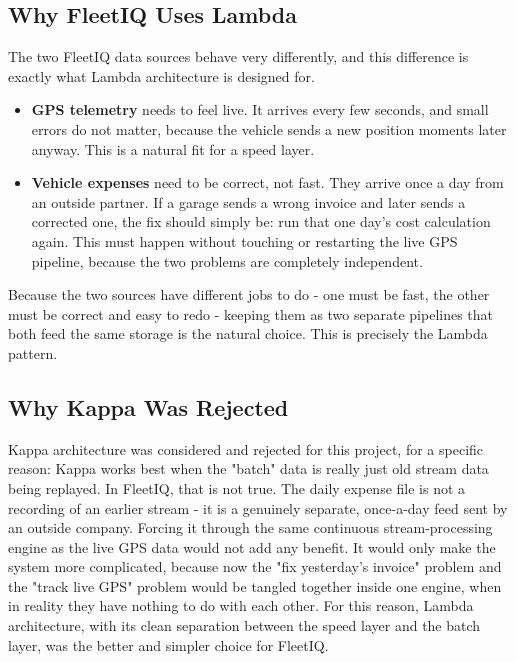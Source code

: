 \documentclass[12pt,a4paper]{article}
\begin{document}
\subsection{Why FleetIQ Uses Lambda}

The two FleetIQ data sources behave very differently, and this difference
is exactly what Lambda architecture is designed for.

\begin{itemize}
  \item \textbf{GPS telemetry} needs to feel live. It arrives every few
    seconds, and small errors do not matter, because the vehicle sends a new
    position moments later anyway. This is a natural fit for a speed layer.
  \item \textbf{Vehicle expenses} need to be correct, not fast. They arrive
    once a day from an outside partner. If a garage sends a wrong invoice
    and later sends a corrected one, the fix should simply be: run that
    one day's cost calculation again. This must happen without
    touching or restarting the live GPS pipeline, because the two problems
    are completely independent.
\end{itemize}

Because the two sources have different jobs to do - one must be fast, the
other must be correct and easy to redo - keeping them as two separate
pipelines that both feed the same storage is the natural choice. This is
precisely the Lambda pattern.

\subsection{Why Kappa Was Rejected}

Kappa architecture was considered and rejected for this project, for a
specific reason: Kappa works best when the "batch" data is really just
old stream data being replayed. In FleetIQ, that is not true. The
daily expense file is not a recording of an earlier stream - it is a
genuinely separate, once-a-day feed sent by an outside company. Forcing it
through the same continuous stream-processing engine as the live GPS data
would not add any benefit. It would only make the system more complicated,
because now the "fix yesterday's invoice" problem and the "track live GPS"
problem would be tangled together inside one engine, when in reality they
have nothing to do with each other. For this reason, Lambda architecture,
with its clean separation between the speed layer and the batch layer, was
the better and simpler choice for FleetIQ.
\end{document}
